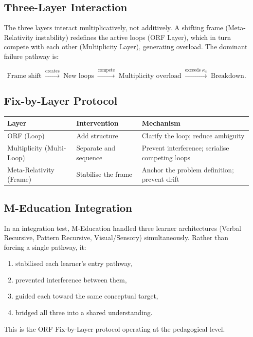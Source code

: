 \documentclass[12pt,a4paper]{article}
\theoremstyle{definition}
\begin{document}
\subsection{Three-Layer Interaction}

The three layers interact multiplicatively, not additively.  A shifting
frame (Meta-Relativity instability) redefines the active loops (ORF Layer),
which in turn compete with each other (Multiplicity Layer), generating
overload.  The dominant failure pathway is:

\begin{equation}
  \text{Frame shift}
  \;\xrightarrow{\text{creates}}\;
  \text{New loops}
  \;\xrightarrow{\text{compete}}\;
  \text{Multiplicity overload}
  \;\xrightarrow{\text{exceeds } \kappa_a}\;
  \text{Breakdown}.
\end{equation}

\subsection{Fix-by-Layer Protocol}

\begin{longtable}{@{}p{4cm}p{3.5cm}p{5.5cm}@{}}
  \toprule
  \textbf{Layer} & \textbf{Intervention} & \textbf{Mechanism} \\
  \midrule
  ORF (Loop) & Add structure & Clarify the loop; reduce ambiguity \\
  Multiplicity (Multi-Loop) & Separate and sequence & Prevent interference;
    serialise competing loops \\
  Meta-Relativity (Frame) & Stabilise the frame & Anchor the problem
    definition; prevent drift \\
  \bottomrule
\end{longtable}

\subsection{M-Education Integration}

\begin{tcolorbox}[note,title={M-Education Cross-Layer Result}]
  In an integration test, M-Education handled three learner architectures
  (Verbal Recursive, Pattern Recursive, Visual/Sensory) simultaneously.
  Rather than forcing a single pathway, it:
  \begin{enumerate}[label=\arabic*.]
    \item stabilised each learner's entry pathway,
    \item prevented interference between them,
    \item guided each toward the same conceptual target,
    \item bridged all three into a shared understanding.
  \end{enumerate}
  This is the ORF Fix-by-Layer protocol operating at the pedagogical level.
\end{tcolorbox}
\end{document}
